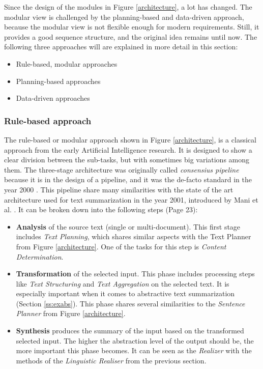 Since the design of the modules in Figure \ref{architecture}, a lot has changed. The modular view is challenged by the planning-based and data-driven approach, because the modular view is not flexible enough for modern requirements. Still, it provides a good sequence structure, and the original idea remains until now. The following three approaches will are explained in more detail in this section:

\begin{itemize}
	\item Rule-based, modular approaches
	\item Planning-based approaches
	\item Data-driven approaches
\end{itemize}

\subsubsection{Rule-based approach}\label{ss:rule}

The rule-based or modular approach shown in Figure \ref{architecture}, is a classical approach from the early Artificial Intelligence research. It is designed to show a clear division between the sub-tasks, but with sometimes big variations among them. The three-stage architecture was originally called \textit{consensius pipeline} because it is in the design of a pipeline, and it was the de-facto standard in the year 2000 \cite{reiter2}. This pipeline share many similarities with the state of the art architecture used for text summarization in the year 2001, introduced by Mani et al. \cite{mani}. It can be broken down into the following steps \cite{gatt} (Page 23):

\begin{itemize}
	\item \textbf{Analysis} of the source text (single or multi-document). This first stage includes \textit{Text Planning}, which shares similar aspects with the Text Planner from Figure \ref{architecture}. One of the tasks for this step is \textit{Content Determination}.
	\item \textbf{Transformation} of the selected input. This phase includes processing steps like \textit{Text Structuring} and \textit{Text Aggregation} on the selected text. It is especially important when it comes to abstractive text summarization (Section \ref{ss:exabs}). This phase shares several similarities to the \textit{Sentence Planner} from Figure \ref{architecture}.
	\item \textbf{Synthesis} produces the summary of the input based on the transformed selected input. The higher the abstraction level of the output should be, the more important this phase becomes. It can be seen as the \textit{Realizer} with the methods of the \textit{Linguistic Realiser} from the previous section.
\end{itemize}

